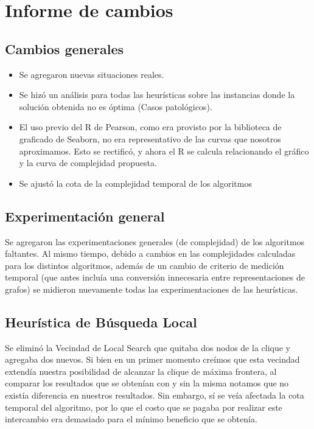 \section{Informe de cambios}
	\subsection*{Cambios generales}
	
		\begin{itemize}
			\item Se agregaron nuevas situaciones reales.
			
			\item Se hizó un análisis para todas las heurísticas sobre las instancias donde la solución obtenida no es óptima (Casos patológicos).
			
			\item El uso previo del R de Pearson, como era provisto por la biblioteca de graficado de Seaborn, no era representativo de las curvas que nosotros aproximamos. Esto se rectificó, y ahora el R se calcula relacionando el gráfico y la curva de complejidad propuesta.			
			
			\item Se ajustó la cota de la complejidad temporal de los algoritmos
			
		\end{itemize}	

	\subsection*{Experimentación general}

		Se agregaron las experimentaciones generales (de complejidad) de los algoritmos faltantes. Al mismo tiempo, debido a cambios en las complejidades calculadas para los distintos algoritmos, además de un cambio de criterio de medición temporal (que antes incluía una conversión innecesaria entre representaciones de grafos) se midieron nuevamente todas las experimentaciones de las heurísticas.
		
	\subsection*{Heurística de Búsqueda Local}
		
		Se eliminó la Vecindad de Local Search que quitaba dos nodos de la clique y agregaba dos nuevos. Si bien en un primer momento creímos que esta vecindad extendía nuestra posibilidad de alcanzar la clique de máxima frontera, al comparar los resultados que se obtenían con y sin la misma notamos que no existía diferencia en nuestros resultados. Sin embargo, sí se veía afectada la cota temporal del algoritmo, por lo que el costo que se pagaba por realizar este intercambio era demasiado para el mínimo beneficio que se obtenía.
		
